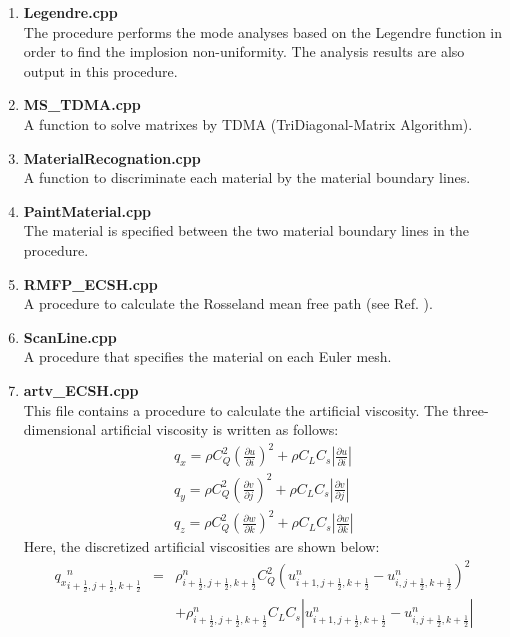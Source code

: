 \begin{enumerate}
\item {\bf Legendre.cpp}\\
The procedure performs the mode analyses based on the Legendre function in order to find the implosion non-uniformity. The analysis results are also output in this procedure. 
\fi
\item {\bf MS\_TDMA.cpp}\\
A function to solve matrixes by TDMA (TriDiagonal-Matrix Algorithm).
\item {\bf MaterialRecognation.cpp}\\
A function to discriminate each material by the material boundary lines. 
\item {\bf PaintMaterial.cpp\\}
The material is specified between the two material boundary lines in the procedure. 
\item {\bf RMFP\_ECSH.cpp}\\
A procedure to calculate the Rosseland mean free path (see Ref. \cite{Zeldovich}). 
\item {\bf ScanLine.cpp}\\
A procedure that specifies the material on each Euler mesh. 
\item {\bf artv\_ECSH.cpp}\\
This file contains a procedure to calculate the artificial viscosity. The three-dimensional artificial viscosity is written as follows: 
\begin{eqnarray}
q_x = \rho C^2_Q \left( \frac{\partial u}{\partial i} \right)^2 + \rho C_L C_s |\frac{\partial u}{\partial i}| \\
q_y = \rho C^2_Q \left( \frac{\partial v}{\partial j} \right)^2 + \rho C_L C_s |\frac{\partial v}{\partial j}| \\
q_z = \rho C^2_Q \left( \frac{\partial w}{\partial k} \right)^2 + \rho C_L C_s |\frac{\partial w}{\partial k}| 
\end{eqnarray}
Here, the discretized artificial viscosities are shown below: 
\small
\begin{eqnarray}
{q_x}^n_{i+\frac{1}{2},j+\frac{1}{2},k+\frac{1}{2}} &=& \rho^n_{i+\frac{1}{2},j+\frac{1}{2},k+\frac{1}{2}} C_Q^2 (u^n_{i+1,j+\frac{1}{2},k+\frac{1}{2}} - u^n_{i,j+\frac{1}{2},k+\frac{1}{2}})^2 \\\nonumber
&& + \rho^n_{i+\frac{1}{2},j+\frac{1}{2},k+\frac{1}{2}} C_L C_s \left| u^n_{i+1,j+\frac{1}{2},k+\frac{1}{2}}-u^n_{i,j+\frac{1}{2},k+\frac{1}{2}} \right| \\

\end{eqnarray}
\end{enumerate}
